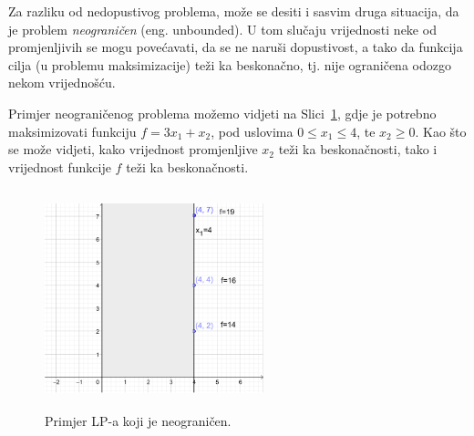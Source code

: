 \documentclass[b5paper, utf8, 11pt, colorlinks]{book}
\theoremstyle{definition}
\begin{document}
 Za razliku od nedopustivog problema, može se desiti i sasvim druga situacija, da je problem \emph{neograničen} (eng. unbounded). U tom slučaju vrijednosti neke od promjenljivih se mogu povećavati, da se ne naruši dopustivost, a tako da funkcija cilja (u problemu maksimizacije) teži ka beskonačno, tj. nije ograničena odozgo nekom vrijednošću. %
 
 Primjer neograničenog problema možemo vidjeti na Slici~\ref{fig:unbounded_solution}, gdje je potrebno maksimizovati funkciju $f = 3 x_1 + x_2$, pod uslovima $0\leq x_1 \leq 4$, te $x_2 \geq 0$. Kao što se može vidjeti,  kako vrijednost promjenljive $x_2$ teži ka beskonačnosti, tako i vrijednost funkcije $f$ teži ka beskonačnosti.
 
  \begin{figure}[H]
     \centering
     \includegraphics[width=180pt, height=180pt]{fig4.eps}
     \caption{Primjer LP-a koji je neograničen.}
     \label{fig:unbounded_solution}
 \end{figure}
 
 

\end{document}
